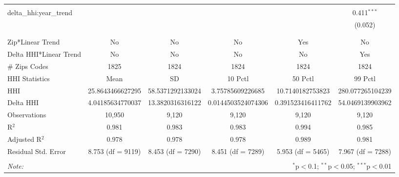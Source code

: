 \begin{table}[H]
{\begin{tabular}{@{\extracolsep{5pt}}lccccc}
   & & & & & \\  

  delta\_hhi:year\_trend &  &  &  &  & 0.411$^{***}$ \\  

   &  &  &  &  & (0.052) \\  

   & & & & & \\  

 \hline \\[-1.8ex]  

 Zip*Linear Trend & No & No & No & Yes & No \\  

 Delta HHI*Linear Trend & No & No & No & No & Yes \\  

 # Zips Codes & 1825 & 1824 & 1824 & 1824 & 1824 \\  

 HHI Statistics & Mean & SD & 10 Pctl & 50 Pctl & 99 Pctl \\  

 HHI & 25.8643466627295 & 58.5371292133024 & 3.75785609226685 & 10.7140182753823 & 280.077265104239 \\  

 Delta HHI & 4.04185634770037 & 13.3820316316122 & 0.0144503524074306 & 0.391523416411762 & 54.0469139903962 \\  

 Observations & 10,950 & 9,120 & 9,120 & 9,120 & 9,120 \\  

 R$^{2}$ & 0.981 & 0.983 & 0.983 & 0.994 & 0.985 \\  

 Adjusted R$^{2}$ & 0.978 & 0.978 & 0.978 & 0.989 & 0.981 \\  

 Residual Std. Error & 8.753 (df = 9119) & 8.453 (df = 7290) & 8.451 (df = 7289) & 5.953 (df = 5465) & 7.967 (df = 7288) \\  

 \hline  

 \hline \\[-1.8ex]  

 \textit{Note:}  & \multicolumn{5}{r}{$^{*}$p$<$0.1; $^{**}$p$<$0.05; $^{***}$p$<$0.01} \\  

 \end{tabular}}  

 \end{table}  

